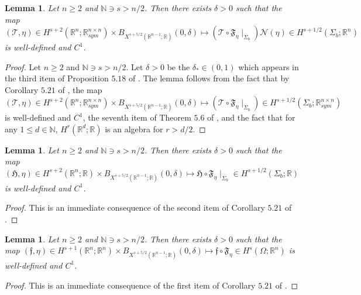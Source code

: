 \documentclass[11pt,letterpaper,reqno]{amsart}
\newtheorem{lemma}[theorem]{Lemma}
\numberwithin{equation}{section}
\begin{document}
\begin{lemma} \label{omegalemma}
    Let \(n \geq 2\) and \(\mathbb{N} \ni s>n/2\). Then there exists \(\delta>0\) such that the map \((\mathcal{T},\eta) \in H^{s+2}(\mathbb{R}^{n};\mathbb{R}_{sym}^{n \times n}) \times B_{X^{s+5/2}(\mathbb{R}^{n-1};\mathbb{R})}(0,\delta) \mapsto (\mathcal{T} \circ \mathfrak{F}_{\eta} \mid_{\Sigma_{b}})\mathcal{N}(\eta) \in H^{s+1/2}(\Sigma_{b};\mathbb{R}^{n})\) is well-defined and \(C^{1}\).
\end{lemma}
\begin{proof}
    Let \(n \geq 2\) and \(\mathbb{N} \ni s>n/2\). Let \(\delta>0\) be the \(\delta_{*} \in (0,1)\) which appears in the third item of Proposition \(5.18\) of \cite{leoni2023traveling}. The lemma follows from the fact that by Corollary \(5.21\) of \cite{leoni2023traveling}, the map \((\mathcal{T},\eta) \in H^{s+2}(\mathbb{R}^{n};\mathbb{R}_{sym}^{n \times n}) \times B_{X^{s+5/2}(\mathbb{R}^{n-1};\mathbb{R})}(0,\delta) \mapsto (\mathcal{T} \circ \mathfrak{F}_{\eta} \mid_{\Sigma_{b}}) \in H^{s+1/2}(\Sigma_{b};\mathbb{R}_{sym}^{n \times n})\) is well-defined and \(C^{1}\), the seventh item of Theorem \(5.6\) of \cite{leoni2023traveling}, and the fact that for any \(1 \leq d \in \mathbb{N}\), \(H^{r}(\mathbb{R}^{d};\mathbb{R})\) is an algebra for \(r>d/2\). 
\end{proof}
\begin{lemma} \label{ol2}
    Let \(n \geq 2\) and \(\mathbb{N} \ni s >n/2\). Then there exists \(\delta>0\) such that the map \((\mathfrak{H},\eta) \in H^{s+2}(\mathbb{R}^{n};\mathbb{R}) \times B_{X^{s+5/2}(\mathbb{R}^{n-1};\mathbb{R})}(0,\delta) \mapsto \mathfrak{H} \circ \mathfrak{F}_{\eta} \mid_{\Sigma_{b}} \in H^{s+1/2}(\Sigma_{b};\mathbb{R})\) is well-defined and \(C^{1}\).
\end{lemma}
\begin{proof}
    This is an immediate consequence of the second item of Corollary \(5.21\) of \cite{leoni2023traveling}.
\end{proof}
\begin{lemma} \label{ol3}
    Let \(n \geq 2\) and \(\mathbb{N} \ni s >n/2\). Then there exists \(\delta>0\) such that the map \((\mathfrak{f},\eta) \in H^{s+1}(\mathbb{R}^{n};\mathbb{R}^{n}) \times B_{X^{s+5/2}(\mathbb{R}^{n-1};\mathbb{R})}(0,\delta) \mapsto \mathfrak{f} \circ \mathfrak{F}_{\eta} \in H^{s}(\Omega;\mathbb{R}^{n})\) is well-defined and \(C^{1}\).
\end{lemma}
\begin{proof}
    This is an immediate consequence of the first item of Corollary \(5.21\) of \cite{leoni2023traveling}.
\end{proof}
\end{document}
